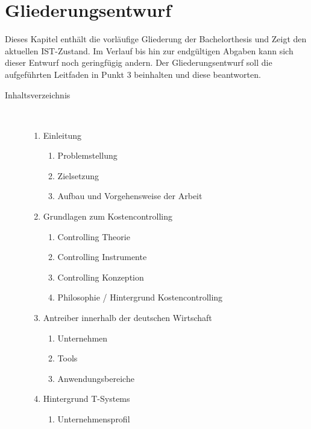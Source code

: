 
\chapter{Gliederungsentwurf}
\label{ch:Gliederungsentwurf}

Dieses Kapitel enthält die vorläufige Gliederung der Bachelorthesis und Zeigt den aktuellen IST-Zustand. Im Verlauf bis hin zur endgültigen Abgaben kann sich dieser Entwurf noch geringfügig andern. Der Gliederungsentwurf soll die aufgeführten Leitfaden in Punkt 3 beinhalten und diese beantworten.

\begin{center}
\begin{description}
\item[Inhaltsverzeichnis]~\par
\begin{enumerate}
	\item Einleitung
	\begin{enumerate}
         \item Problemstellung 
         \item Zielsetzung
         \item Aufbau und Vorgehensweise der Arbeit
    \end{enumerate}     
	\item Grundlagen zum Kostencontrolling
	\begin{enumerate}
         \item Controlling Theorie 
         \item Controlling Instrumente
         \item Controlling Konzeption
         \item Philosophie / Hintergrund Kostencontrolling
    \end{enumerate}     
	\item Antreiber innerhalb der deutschen Wirtschaft
	\begin{enumerate}
         \item Unternehmen
         \item Tools
         \item Anwendungsbereiche
    \end{enumerate}
	\item Hintergrund T-Systems
	\begin{enumerate}
         \item Unternehmensprofil

\end{enumerate}
\end{enumerate}
\end{description}
\end{center}
